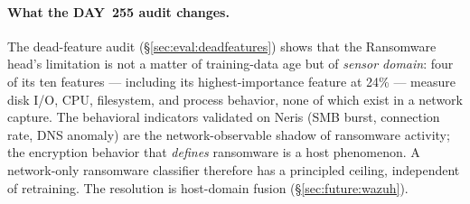 
\paragraph{What the DAY~255 audit changes.}
The dead-feature audit (\S\ref{sec:eval:deadfeatures}) shows that the Ransomware
head's limitation is not a matter of training-data age but of \emph{sensor
domain}: four of its ten features --- including its highest-importance feature at
24\% --- measure disk I/O, CPU, filesystem, and process behavior, none of which
exist in a network capture. The behavioral indicators validated on Neris (SMB
burst, connection rate, DNS anomaly) are the network-observable shadow of
ransomware activity; the encryption behavior that \emph{defines} ransomware is a
host phenomenon. A network-only ransomware classifier therefore has a principled
ceiling, independent of retraining. The resolution is host-domain fusion
(\S\ref{sec:future:wazuh}).

